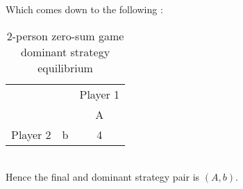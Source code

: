 \documentclass[10pt, a4paper]{report}
\begin{document}
\\\\
Which comes down to the following :
\begin{table}[ht!]
	\hspace{-4em}
	\centering
	\begin{tabular}{ccc|}
		& & \multicolumn{1}{c}{Player 1}       \\ \cline{3-3}
		& & \multicolumn{1}{c}{A}              \\ \cline{3-3}
		Player 2 & \multicolumn{1}{|c|}{b} & 4 \\ \cline{3-3}
	\end{tabular}
	\caption{2-person zero-sum game\\ dominant strategy equilibrium}
\end{table}
\\
Hence the final and dominant strategy pair is $(A,b)$.

\end{document}
